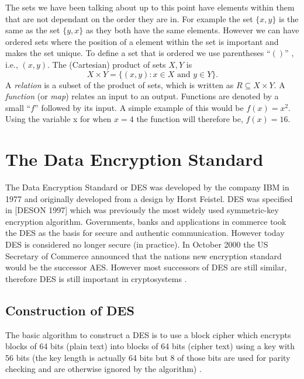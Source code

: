 \documentclass[11pt,a4paper, notitlepage]{report}
\begin{document}
The sets we have been talking about up to this point have elements within them that are not dependant on the order they are in. For example the set $\{x,y\}$ is the same as the set $\{y, x\}$ as they both have the same elements. However we can have ordered sets where the position of a element within the set is important and makes the set unique. To define a set that is ordered we use parentheses  ``$()$'' , i.e., $(x,y)$.
The (Cartesian) product of sets $X, Y$ is
\begin{displaymath}
  X \times Y = \{(x,y) : x \in X \text{ and } y \in Y\}.
\end{displaymath}
A \emph{relation} is a subset of the product of sets, which is written as $R \subseteq X \times Y$. A \emph{function} (or \emph{map}) relates an input to an output. Functions are denoted by a small ``$f$'' followed by its input. A simple example of this would be $f(x) = x^2$. Using the variable x for when $x=4$ the function will therefore be, $f(x) = 16$.















\chapter{The Data Encryption Standard}
\label{cha:DES}

The Data Encryption Standard  or DES was developed by the company IBM in 1977 and originally developed from a design by Horst Feistel. DES was specified in [DESON 1997] which was previously the most widely used symmetric-key encryption algorithm. Governments, banks and applications in commerce took the DES as the basis for secure and authentic communication. However today DES is considered no longer secure (in practice). In October 2000 the US Secretary of Commerce announced that the nations new encryption standard would be the successor AES. However most successors of DES are still similar, therefore DES is still important in cryptosystems \cite{DBLP:series/isc/DelfsK07} \cite{DBLP:books/sp/Buchmann02}.

\section{Construction of DES}
\label{sec:conDES}

The basic algorithm to construct a DES is to use a block cipher which encrypts blocks of 64 bits (plain text) into blocks of 64 bits (cipher text) using a key with 56 bits (the key length is actually 64 bits but 8 of those bits are used for parity checking and are otherwise ignored by the algorithm) \cite{Fabio2000LogicalSAT}.
\end{document}
